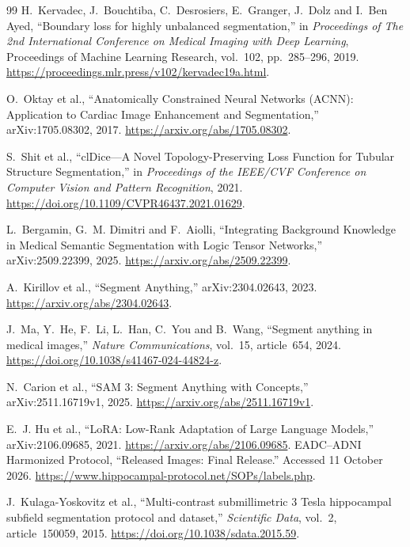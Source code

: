 \documentclass[12pt,a4paper]{article}
\begin{document}
\begin{thebibliography}{99}
H.~Kervadec, J.~Bouchtiba, C.~Desrosiers, E.~Granger, J.~Dolz and
I.~Ben Ayed, ``Boundary loss for highly unbalanced segmentation,''
in \emph{Proceedings of The 2nd International Conference on Medical
Imaging with Deep Learning}, Proceedings of Machine Learning Research,
vol.~102, pp.~285--296, 2019.
\url{https://proceedings.mlr.press/v102/kervadec19a.html}.

O.~Oktay et al., ``Anatomically Constrained Neural Networks (ACNN):
Application to Cardiac Image Enhancement and Segmentation,''
arXiv:1705.08302, 2017. \url{https://arxiv.org/abs/1705.08302}.

S.~Shit et al., ``clDice---A Novel Topology-Preserving Loss Function
for Tubular Structure Segmentation,'' in \emph{Proceedings of the
IEEE/CVF Conference on Computer Vision and Pattern Recognition}, 2021.
\url{https://doi.org/10.1109/CVPR46437.2021.01629}.

L.~Bergamin, G.~M. Dimitri and F.~Aiolli, ``Integrating Background
Knowledge in Medical Semantic Segmentation with Logic Tensor Networks,''
arXiv:2509.22399, 2025. \url{https://arxiv.org/abs/2509.22399}.

A.~Kirillov et al., ``Segment Anything,'' arXiv:2304.02643, 2023.
\url{https://arxiv.org/abs/2304.02643}.

J.~Ma, Y.~He, F.~Li, L.~Han, C.~You and B.~Wang,
``Segment anything in medical images,'' \emph{Nature Communications},
vol.~15, article~654, 2024.
\url{https://doi.org/10.1038/s41467-024-44824-z}.

N.~Carion et al., ``SAM 3: Segment Anything with Concepts,''
arXiv:2511.16719v1, 2025. \url{https://arxiv.org/abs/2511.16719v1}.

E.~J. Hu et al., ``LoRA: Low-Rank Adaptation of Large Language Models,''
arXiv:2106.09685, 2021. \url{https://arxiv.org/abs/2106.09685}.
EADC--ADNI Harmonized Protocol, ``Released Images: Final Release.''
Accessed 11 October 2026.
\url{https://www.hippocampal-protocol.net/SOPs/labels.php}.

J.~Kulaga-Yoskovitz et al., ``Multi-contrast submillimetric 3 Tesla
hippocampal subfield segmentation protocol and dataset,''
\emph{Scientific Data}, vol.~2, article~150059, 2015.
\url{https://doi.org/10.1038/sdata.2015.59}.


\end{thebibliography}
\end{document}
